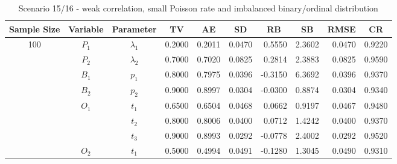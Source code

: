 \documentclass[letterpaper]{article}
\begin{document}
\begin{table}[h]
\centering
\caption{Scenario 15/16 - weak correlation, small Poisson rate and imbalanced binary/ordinal distribution}
\begin{tabular}{cccrrrrrrr}
\hline
Sample Size & Variable    & Parameter      & \multicolumn{1}{c}{TV} & \multicolumn{1}{c}{AE} & \multicolumn{1}{c}{SD} & \multicolumn{1}{c}{RB} & \multicolumn{1}{c}{SB} & \multicolumn{1}{c}{RMSE} & \multicolumn{1}{c}{CR} \\\hline
100         & $P_1$       & $\lambda_1$    & 0.2000                 & 0.2011                 & 0.0470                 & 0.5550                 & 2.3602                 & 0.0470                   & 0.9220                 \\
            & $P_2$       & $\lambda_2$    & 0.7000                 & 0.7020                 & 0.0825                 & 0.2814                 & 2.3883                 & 0.0825                   & 0.9590                 \\
            & $B_1$       & $p_1$          & 0.8000                 & 0.7975                 & 0.0396                 & -0.3150                & 6.3692                 & 0.0396                   & 0.9370                 \\
            & $B_2$       & $p_2$          & 0.9000                 & 0.8997                 & 0.0304                 & -0.0300                & 0.8874                 & 0.0304                   & 0.9340                 \\
            & $O_1$       & $t_1$          & 0.6500                 & 0.6504                 & 0.0468                 & 0.0662                 & 0.9197                 & 0.0467                   & 0.9480                 \\
            &             & $t_2$          & 0.8000                 & 0.8006                 & 0.0400                 & 0.0712                 & 1.4242                 & 0.0400                   & 0.9370                 \\
            &             & $t_3$          & 0.9000                 & 0.8993                 & 0.0292                 & -0.0778                & 2.4002                 & 0.0292                   & 0.9520                 \\
            & $O_2$       & $t_1$          & 0.5000                 & 0.4994                 & 0.0491                 & -0.1280                & 1.3045                 & 0.0490                   & 0.9310                 \\

\end{tabular}
\end{table}
\end{document}
